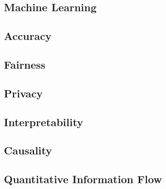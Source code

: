
\subsection{Machine Learning}

\subsection{Accuracy}

\subsection{Fairness}

\subsection{Privacy}

\subsection{Interpretability}

\subsection{Causality}

\subsection{Quantitative Information Flow}

